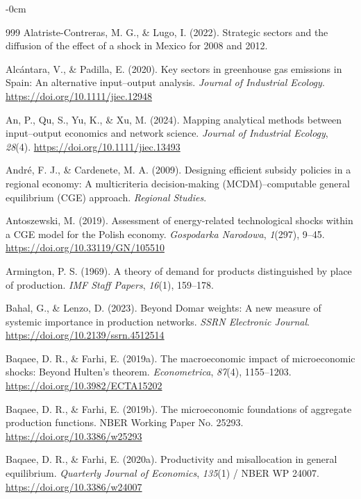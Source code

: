 \documentclass[journal,article,submit,pdftex,moreauthors]{Definitions/mdpi}
\begin{document}
\begin{adjustwidth}{-\extralength}{0cm}
{\begin{thebibliography}{999}
Alatriste-Contreras, M. G., \& Lugo, I. (2022). Strategic sectors and the diffusion of the effect of a shock in Mexico for 2008 and 2012.

Alcántara, V., \& Padilla, E. (2020). Key sectors in greenhouse gas emissions in Spain: An alternative input--output analysis. \textit{Journal of Industrial Ecology}. \url{https://doi.org/10.1111/jiec.12948}

An, P., Qu, S., Yu, K., \& Xu, M. (2024). Mapping analytical methods between input--output economics and network science. \textit{Journal of Industrial Ecology}, \textit{28}(4). \url{https://doi.org/10.1111/jiec.13493}

André, F. J., \& Cardenete, M. A. (2009). Designing efficient subsidy policies in a regional economy: A multicriteria decision-making (MCDM)--computable general equilibrium (CGE) approach. \textit{Regional Studies}.

Antoszewski, M. (2019). Assessment of energy-related technological shocks within a CGE model for the Polish economy. \textit{Gospodarka Narodowa}, \textit{1}(297), 9--45. \url{https://doi.org/10.33119/GN/105510}

Armington, P. S. (1969). A theory of demand for products distinguished by place of production. \textit{IMF Staff Papers}, \textit{16}(1), 159--178.

Bahal, G., \& Lenzo, D. (2023). Beyond Domar weights: A new measure of systemic importance in production networks. \textit{SSRN Electronic Journal}. \url{https://doi.org/10.2139/ssrn.4512514}

Baqaee, D. R., \& Farhi, E. (2019a). The macroeconomic impact of microeconomic shocks: Beyond Hulten's theorem. \textit{Econometrica}, \textit{87}(4), 1155--1203. \url{https://doi.org/10.3982/ECTA15202}

Baqaee, D. R., \& Farhi, E. (2019b). The microeconomic foundations of aggregate production functions. NBER Working Paper No. 25293. \url{https://doi.org/10.3386/w25293}

Baqaee, D. R., \& Farhi, E. (2020a). Productivity and misallocation in general equilibrium. \textit{Quarterly Journal of Economics}, \textit{135}(1) / NBER WP 24007. \url{https://doi.org/10.3386/w24007}


\end{thebibliography}}
\end{adjustwidth}
\end{document}
